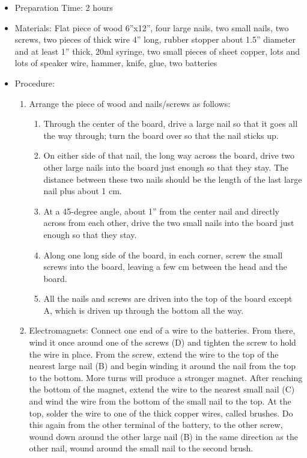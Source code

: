 \begin{itemize}
\item{Preparation Time: 2 hours}
\item{Materials: Flat piece of wood 6”x12”, four large nails, two small nails, two screws, two pieces of thick wire 4” long, rubber stopper about 1.5” diameter and at least 1” thick, 20ml syringe, two small pieces of sheet copper, lots and lots of speaker wire, hammer, knife, glue, two batteries}
\item{Procedure:

\begin{enumerate}
\item{Arrange the piece of wood and nails/screws as follows:

\begin{enumerate}
\item{Through the center of the board, drive a large nail so that it goes all the way through; turn the board over so that the nail sticks up.}
\item{On either side of that nail, the long way across the board, drive two other large nails into the board just enough so that they stay. The distance between these two nails should be the length of the last large nail plus about 1 cm.}
\item{At a 45-degree angle, about 1” from the center nail and directly across from each other, drive the two small nails into the board just enough so that they stay.}
\item{Along one long side of the board, in each corner, screw the small screws into the board, leaving a few cm between the head and the board.}
\item{All the nails and screws are driven into the top of the board except A, which is driven up through the bottom all the way.}
\end{enumerate}
} %

\item{Electromagnets: Connect one end of a wire to the batteries. From there, wind it once around one of the screws (D) and tighten the screw to hold the wire in place. From the screw, extend the wire to the top of the nearest large nail (B) and begin winding it around the nail from the top to the bottom. More turns will produce a stronger magnet. After reaching the bottom of the magnet, extend the wire to the nearest small nail (C) and wind the wire from the bottom of the small nail to the top. At the top, solder the wire to one of the thick copper wires, called brushes. Do this again from the other terminal of the battery, to the other screw, wound down around the other large nail (B) in the same direction as the other nail, wound around the small nail to the second brush.}


\end{enumerate}}
\end{itemize}
